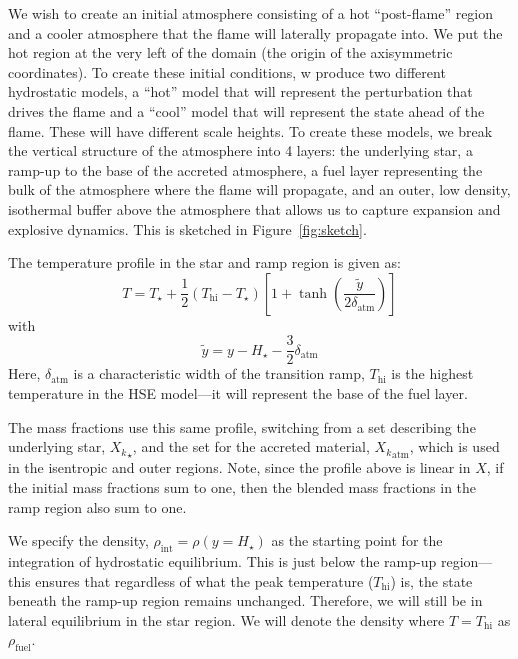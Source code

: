 \documentclass[twocolumn,times,tighten]{aastex62}
\begin{document}
We wish to create an initial atmosphere consisting of a hot
``post-flame'' region and a cooler atmosphere that the flame will
laterally propagate into.  We put the hot region at the very left of
the domain (the origin of the axisymmetric coordinates).  To create
these initial conditions, w produce two different hydrostatic models,
a ``hot'' model that will represent the perturbation that drives the
flame and a ``cool'' model that will represent the state ahead of the
flame.  These will have different scale heights.  To create these
models, we break the vertical structure of the atmosphere into 4
layers: the underlying star, a ramp-up to the base of the
accreted atmosphere, a fuel layer representing the bulk of the
atmosphere where the flame will propagate, and an outer, low density,
isothermal buffer above the atmosphere that allows us
to capture expansion and explosive dynamics.  This is sketched in
Figure~\ref{fig:sketch}.

The temperature profile in the star and ramp region is given as:
\begin{equation}
T = T_\star + \frac{1}{2} (T_\mathrm{hi} - T_\star) \left [ 1 + \tanh\left( \frac{\tilde{y}}{2 \delta_\mathrm{atm}} \right ) \right ]
\end{equation}
with
\begin{equation}
\tilde{y} = y - H_\star - \frac{3}{2} \delta_\mathrm{atm}
\end{equation}
Here, $\delta_\mathrm{atm}$ is a characteristic width of the transition
ramp, $T_\mathrm{hi}$ is the highest temperature in the HSE model---it
will represent the base of the fuel layer.

The mass fractions use this same profile, switching from a set
describing the underlying star, ${X_k}_\star$, and the set for the
accreted material, ${X_k}_\mathrm{atm}$, which is used in the
isentropic and outer regions.  Note, since the profile above is
linear in $X$, if the initial mass fractions sum to one, then the blended
mass fractions in the ramp region also sum to one.

We specify the density, $\rho_\mathrm{int} = \rho(y = H_\star)$ as the
starting point for the integration of hydrostatic equilibrium.  This
is just below the ramp-up region---this ensures that regardless of
what the peak temperature ($T_\mathrm{hi}$) is, the state beneath the
ramp-up region remains unchanged.  Therefore, we will still be in
lateral equilibrium in the star region.  We will denote the density
where $T = T_\mathrm{hi}$ as $\rho_\mathrm{fuel}$.
\end{document}

